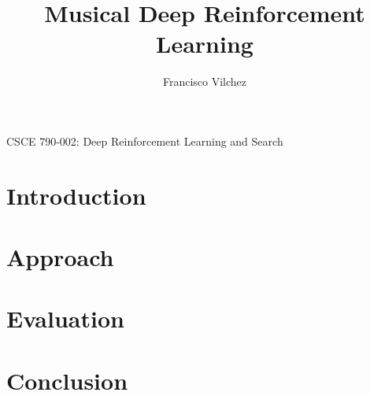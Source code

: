 \documentclass[]{article}
\title{Musical Deep Reinforcement Learning}
\author{Francisco Vilchez}
\makeatletter
\renewcommand\maketitle {
  \begin{center}
    {\Large{\course}}
    \medskip\par\noindent
    {\Large\textbf{\@title}}
    \medskip\par\noindent
    {\Large\@author}
    \medskip\par\noindent
    {\Large\@date}
    \bigskip\par\noindent
  \end{center}
}
\newcommand{\course}{CSCE 790-002: Deep Reinforcement Learning and Search}
\makeatother
\begin{document}
\maketitle






\section*{Introduction}


\section*{Approach}


\section*{Evaluation}


\section*{Conclusion}




\end{document}
